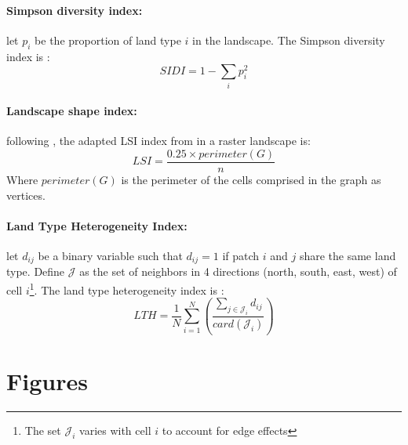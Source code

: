 \paragraph{Simpson diversity index:}

let $p_i$ be the proportion of land type $i$ in the landscape. The Simpson diversity index is : 
\begin{equation}
    SIDI = 1 - \sum_i p_i^2
    \label{eq:simpson}
\end{equation}

\paragraph{Landscape shape index:}
following \cite{McGarigal_1995}, the adapted LSI index from \cite{patton_diversity_1975} in a raster landscape is:
\begin{equation}
    LSI = \frac{0.25\times perimeter(G)}{n}
    \label{eq:LSI}
\end{equation}
Where $perimeter(G)$ is the perimeter of the cells comprised in the graph as vertices.

\paragraph{Land Type Heterogeneity Index:} let $d_{ij}$ be a binary variable such that $d_{ij}=1$ if patch $i$ and $j$ share the same land type. Define $\mathcal{J}$ as the set of neighbors in 4 directions (north, south, east, west) of cell $i$\footnote{The set $\mathcal{J}_i$ varies with cell $i$ to account for edge effects}.
The land type heterogeneity index is : 
\begin{equation}
    LTH = \frac{1}{N}\sum_{i=1}^N\left( \frac{\sum_{j \in \mathcal{J}_i} d_{ij}}{card(\mathcal{J}_i)}\right)
\end{equation}
\label{eq:lth_index}


\clearpage

\section{Figures}





